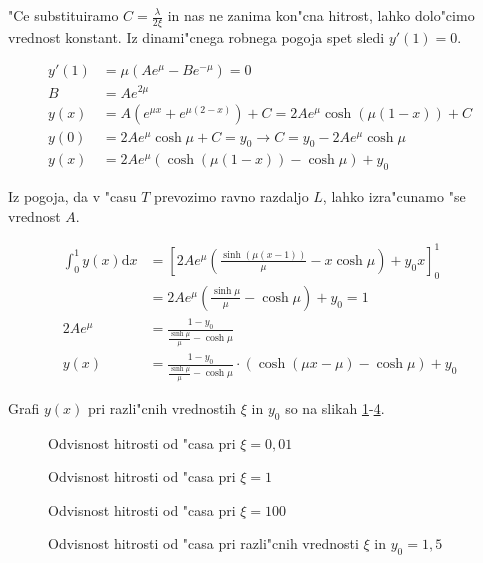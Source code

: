 \documentclass[12pt]{article}
\newcommand{\dd}{\mathrm{d}}
\begin{document}
"Ce substituiramo $C = \frac{\lambda}{2\xi}$ in nas ne zanima kon"cna hitrost, lahko dolo"cimo vrednost konstant. Iz dinami"cnega robnega pogoja spet sledi $y'(1) = 0$. 

\begin{align}
 y'(1) &= \mu ( Ae^\mu - Be^{-\mu} ) = 0 \\
B &= Ae^{2\mu} \\
y(x) &= A( e^{\mu x} + e^{\mu (2-x)} ) + C = 2 A e^{\mu} \cosh ( \mu(1-x) ) + C \\
y(0) &= 2A e^{\mu} \cosh \mu + C = y_0 \rightarrow C = y_0 - 2Ae^\mu \cosh \mu \\
y(x) &= 2Ae^\mu ( \cosh (\mu (1-x)) - \cosh \mu ) + y_0
\end{align}

Iz pogoja, da v "casu $T$ prevozimo ravno razdaljo $L$, lahko izra"cunamo "se vrednost $A$. 

\begin{align}
  \int_0^1 y(x)\dd x &= \left[2Ae^\mu \left( \frac{\sinh(\mu(x-1))}{\mu}  - x\cosh \mu\right) + y_0x\right]_{0}^{1} \\
  &= 2Ae^\mu \left( \frac{\sinh \mu}{\mu} - \cosh \mu \right) + y_0 = 1 \\
2Ae^{\mu} &= \frac{1-y_0}{\frac{\sinh\mu}{\mu} - \cosh \mu } \\
y(x) &= \frac{1-y_0}{\frac{\sinh\mu}{\mu} - \cosh \mu } \cdot \left( \cosh(\mu x - \mu) - \cosh \mu \right) + y_0 \label{eq:hitrost-koncni}
\end{align}

Grafi $y(x)$ pri razli"cnih vrednostih $\xi$ in $y_0$ so na slikah \ref{fig:hitrosti-1}-\ref{fig:hitrosti-mu}. 

\begin{figure}[h!]

\caption{Odvisnost hitrosti od "casa pri $\xi = 0,01$}
\label{fig:hitrosti-1}
\end{figure}

\begin{figure}[h!]

\caption{Odvisnost hitrosti od "casa pri $\xi = 1$}
\label{fig:hitrosti-2}
\end{figure}

\begin{figure}[h!]

\caption{Odvisnost hitrosti od "casa pri $\xi = 100$}
\label{fig:hitrosti-3}
\end{figure}

\begin{figure}[h!]

\caption{Odvisnost hitrosti od "casa pri razli"cnih vrednosti $\xi$ in $y_0 = 1,5$}
\label{fig:hitrosti-mu}
\end{figure}
\end{document}
